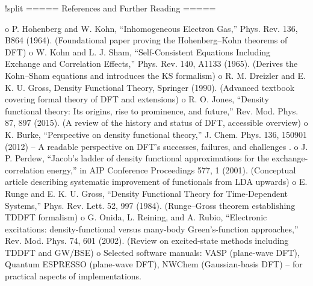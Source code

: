 !split
===== References and Further Reading =====

o P. Hohenberg and W. Kohn, “Inhomogeneous Electron Gas,” Phys. Rev. 136, B864 (1964). (Foundational paper proving the Hohenberg–Kohn theorems of DFT)
o W. Kohn and L. J. Sham, “Self-Consistent Equations Including Exchange and Correlation Effects,” Phys. Rev. 140, A1133 (1965). (Derives the Kohn–Sham equations and introduces the KS formalism)
o R. M. Dreizler and E. K. U. Gross, Density Functional Theory, Springer (1990). (Advanced textbook covering formal theory of DFT and extensions)
o R. O. Jones, “Density functional theory: Its origins, rise to prominence, and future,” Rev. Mod. Phys. 87, 897 (2015). (A review of the history and status of DFT, accessible overview)
o K. Burke, “Perspective on density functional theory,” J. Chem. Phys. 136, 150901 (2012) – A readable perspective on DFT’s successes, failures, and challenges  .
o J. P. Perdew, “Jacob’s ladder of density functional approximations for the exchange-correlation energy,” in AIP Conference Proceedings 577, 1 (2001). (Conceptual article describing systematic improvement of functionals from LDA upwards)
o E. Runge and E. K. U. Gross, “Density Functional Theory for Time-Dependent Systems,” Phys. Rev. Lett. 52, 997 (1984). (Runge–Gross theorem establishing TDDFT formalism)
o G. Onida, L. Reining, and A. Rubio, “Electronic excitations: density-functional versus many-body Green’s-function approaches,” Rev. Mod. Phys. 74, 601 (2002). (Review on excited-state methods including TDDFT and GW/BSE)
o Selected software manuals: VASP (plane-wave DFT), Quantum ESPRESSO (plane-wave DFT), NWChem (Gaussian-basis DFT) – for practical aspects of implementations.

